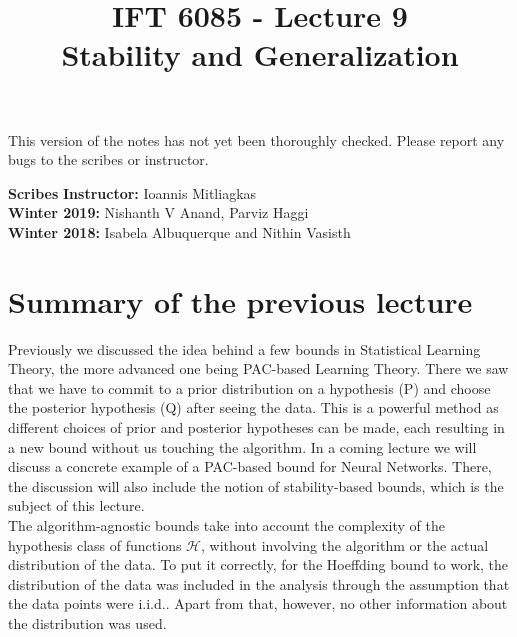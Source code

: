 \documentclass{article}
\title{IFT 6085 - Lecture 9 \\ Stability and Generalization}
\date{}
\begin{document}
 

\maketitle

\vspace{-0.5in}
\begin{center}
This version of the notes has not yet been thoroughly checked.
Please report any bugs to the scribes or instructor.
\end{center}
\vspace{0.2in}

\textbf{Scribes}\hfill
\textbf{Instructor:}  Ioannis Mitliagkas\\
\textbf{Winter 2019:} Nishanth V Anand, Parviz Haggi\\
\textbf{Winter 2018:} Isabela Albuquerque and Nithin Vasisth



\newcommand{\infgc}{\inf_{g \in \mathcal{C}}}
\newcommand{\supgc}{\sup_{g \in \mathcal{C}}}

\newcommand{\Prob}{\mathbb{P}}
\newcommand{\E}{\mathbb{E}}
\newcommand{\reals}{\mathbb{R}}

\section{Summary of the previous lecture}
Previously we discussed the idea behind a few bounds in Statistical Learning Theory, the more advanced one being PAC-based Learning Theory. There we saw that we have to commit to a prior distribution on a hypothesis (P) and choose the posterior hypothesis (Q) after seeing the data. This is a powerful method as different choices of prior and posterior hypotheses can be made, each resulting in a new bound without us touching the algorithm. 
In a coming lecture we will discuss a concrete example of a PAC-based bound for Neural Networks. There, the discussion will also include the notion of stability-based bounds, which is the subject of this lecture.\\


The algorithm-agnostic bounds take into account the complexity of the hypothesis class of functions $\mathcal{H}$, without involving the algorithm or the actual distribution of the data. To put it correctly, for the Hoeffding bound to work, the distribution of the data was included in the analysis through the assumption that the data points were i.i.d.. Apart from that, however, no other information about the distribution was used. \\
\end{document}
